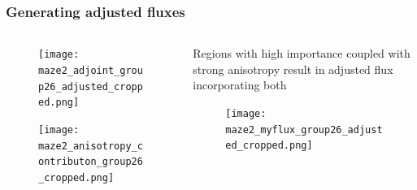 \documentclass[handout]{beamer}
\renewcommand{\(}{\begin{columns}}
\renewcommand{\)}{\end{columns}}
\newcommand{\<}[1]{\begin{column}{#1}}
\renewcommand{\>}{\end{column}}
\begin{document}
\begin{frame}[fragile]
  \frametitle{Generating adjusted fluxes}
  \begin{columns}
    \begin{column}{0.5\textwidth}
  	\begin{figure}
  	\begin{center}
  		\texttt{[image: maze2\_adjoint\_group26\_adjusted\_cropped.png]}
	\end{center}
  	\end{figure}
  	  \begin{figure}
  	\begin{center}
  		\texttt{[image: maze2\_anisotropy\_contributon\_group26\_cropped.png]}
	\end{center}
  	\end{figure}
    \end{column}
  \pause
    \begin{column}{0.5\textwidth}
   Regions with high importance coupled with strong anisotropy result in adjusted flux incorporating both
  	\begin{figure}
  	\begin{center}
  		\texttt{[image: maze2\_myflux\_group26\_adjusted\_cropped.png]}
	\end{center}
  	\end{figure}
  	\end{column}  
  \end{columns}
\end{frame}

\end{document}
